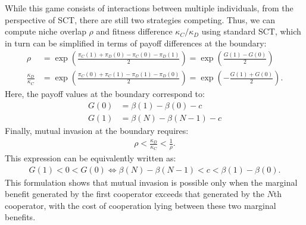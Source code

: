 \documentclass[12pt]{article}
\begin{document}
While this game consists of interactions between multiple individuals, from the perspective of SCT, there are still two strategies competing.
Thus, we can compute niche overlap $\rho$ and fitness difference $\kappa_C/\kappa_D$ using standard SCT, which in turn can be simplified in terms of payoff differences at the boundary:
\begin{align}
\rho &= \exp\left(\frac{\pi_C(1)+\pi_D(0)-\pi_C(0)-\pi_D(1)}{2}\right) = \exp\left(\frac{G(1)-G(0)}{2}\right)\\
\frac{\kappa_D}{\kappa_C} &= \exp\left(\frac{\pi_C(0)+\pi_C(1)-\pi_D(1)-\pi_D(0)}{2}\right) = \exp\left(-\frac{G(1)+G(0)}{2}\right).
\end{align}
Here, the payoff values at the boundary correspond to: 
\begin{align}
G(0) &= \beta(1) - \beta(0) -c\\
G(1) &= \beta(N) - \beta(N-1) - c
\end{align}
Finally, mutual invasion at the boundary requires:
\begin{align}
\rho < \frac{\kappa_D}{\kappa_C} < \frac{1}{\rho}.
\end{align}
This expression can be equivalently written as:
\begin{align}
G(1) < 0 < G(0) \iff \beta(N) - \beta(N-1) < c < \beta(1) - \beta(0).
\end{align}
This formulation shows that mutual invasion is possible only when the marginal benefit generated by the first cooperator exceeds that generated by the \(N\)th cooperator, with the cost of cooperation lying between these two marginal benefits.




\end{document}
